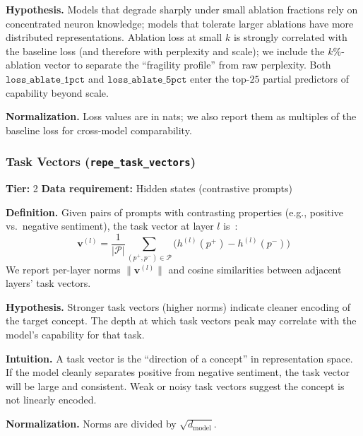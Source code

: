 \documentclass[preprint]{neurips_2025}
\begin{document}
\textbf{Hypothesis.} Models that degrade sharply under small ablation fractions rely on concentrated neuron knowledge; models that tolerate larger ablations have more distributed representations. Ablation loss at small $k$ is strongly correlated with the baseline loss (and therefore with perplexity and scale); we include the $k\%$-ablation vector to separate the ``fragility profile'' from raw perplexity. Both $\texttt{loss\_ablate\_1pct}$ and $\texttt{loss\_ablate\_5pct}$ enter the top-$25$ partial predictors of capability beyond scale.

\textbf{Normalization.} Loss values are in nats; we also report them as multiples of the baseline loss for cross-model comparability.
\label{app:repe}

\subsubsection{Task Vectors (\texttt{repe\_task\_vectors})}
\label{app:task-vectors}

\textbf{Tier:} 2 \quad \textbf{Data requirement:} Hidden states (contrastive prompts)

\textbf{Definition.}
Given pairs of prompts with contrasting properties (e.g., positive vs.\ negative sentiment), the task vector at layer $l$ is~\citep{zou2023representation}:
\begin{equation}
  \mathbf{v}^{(l)} = \frac{1}{|\mathcal{P}|}\sum_{(p^+, p^-) \in \mathcal{P}} \bigl(h^{(l)}(p^+) - h^{(l)}(p^-)\bigr)
\end{equation}
We report per-layer norms $\|\mathbf{v}^{(l)}\|$ and cosine similarities between adjacent layers' task vectors.

\textbf{Hypothesis.}
Stronger task vectors (higher norms) indicate cleaner encoding of the target concept. The depth at which task vectors peak may correlate with the model's capability for that task.

\textbf{Intuition.}
A task vector is the ``direction of a concept'' in representation space. If the model cleanly separates positive from negative sentiment, the task vector will be large and consistent. Weak or noisy task vectors suggest the concept is not linearly encoded.

\textbf{Normalization.} Norms are divided by $\sqrt{d_{\text{model}}}$.

\end{document}
